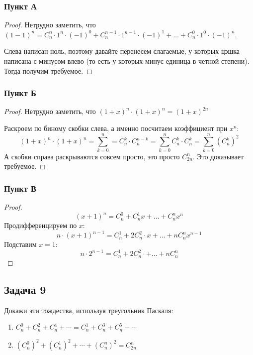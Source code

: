 \subsubsection{Пункт А}

\begin{proof}
Нетрудно заметить, что $(1 - 1)^n = C^n_n\cdot 1^n \cdot (-1)^0 + C^{n-1}_n\cdot 1^{n-1} \cdot (-1)^1 + \ldots + C^{0}_n \cdot 1^0 \cdot (-1)^n$.

Слева написан ноль, поэтому давайте перенесем слагаемые, у которых цэшка написана с минусом влево (то есть у которых минус единица в четной степени). Тогда получим требуемое.
\end{proof}

\subsubsection{Пункт Б}
\begin{proof}
Нетрудно заметить, что $(1+x)^{n} \cdot (1+x)^{n} = (1 + x)^{2n}$

Раскроем по биному скобки слева, а именно посчитаем коэффициент при $x^n$:
\[
(1+x)^{n} \cdot (1+x)^{n} = \sum_{k=0}^{n} = C^k_{n} \cdot C^{n-k}_{n} = \sum_{k=0}^{n} C^k_{n} \cdot C^{k}_{n} = \sum_{k=0}^{n} (C^k_{n})^2
\]
А скобки справа раскрываются совсем просто, это просто $C^n_{2n}$. Это доказывает требуемое.
\end{proof}
\subsubsection{Пункт В}
\begin{proof}
\[
(x+1)^n = C^0_n + C^1_nx + \ldots + C^n_nx^n
\]
Продифференцируем по $x$:
\[
n \cdot (x + 1)^{n-1} = C^{1}_n + 2C^2_n\cdot x + \ldots + n C^n_n x^{n-1}
\]
Подставим $x = 1$:
\[
n \cdot 2^{n-1} = C^{1}_n + 2C^2_n\cdot + \ldots + n C^n_n
\]
\end{proof}
\subsection{Задача 9}
Докажи эти тождества, используя треугольник Паскаля:
\begin{enumerate}[label=\asbuk*)]
    \item $C_n^0 + C_n^2 + C_n^4 + \cdots = C_n^1 + C_n^3 + C_n^5 + \cdots$

    \item $(C_n^0)^2 + (C_n^1)^2 + \cdots + (C_n^n)^2 = C_{2n}^n$
\end{enumerate}
